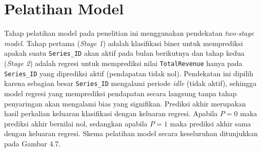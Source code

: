 \begin{table}[H]
  \centering
  \caption{Preview Data Setelah Proses \textit{Feature Engineering} (5 Baris Pertama)}
  \label{tab:df_final_preview}
\end{table}


\section{Pelatihan Model}
\label{subsec:pelatihan_model}

Tahap pelatihan model pada penelitian ini menggunakan pendekatan \textit{two-stage model}. Tahap pertama (\textit{Stage 1}) adalah klasifikasi biner untuk memprediksi apakah suatu \texttt{Series\_ID} akan aktif pada bulan berikutnya dan tahap kedua (\textit{Stage 2}) adalah regresi untuk memprediksi nilai \texttt{TotalRevenue} hanya pada \texttt{Series\_ID} yang diprediksi aktif (pendapatan tidak nol). Pendekatan ini dipilih karena sebagian besar \texttt{Series\_ID} mengalami periode \textit{idle} (tidak aktif), sehingga model regresi yang memprediksi pendapatan secara langsung tanpa tahap penyaringan akan mengalami bias yang signifikan. Prediksi akhir merupakan hasil perkalian keluaran klasifikasi dengan keluaran regresi. Apabila $P = 0$ maka prediksi akhir bernilai nol, sedangkan apabila $P = 1$ maka prediksi akhir sama dengan keluaran regresi. Skema pelatihan model secara keseluruhan ditunjukkan pada Gambar 4.7.

